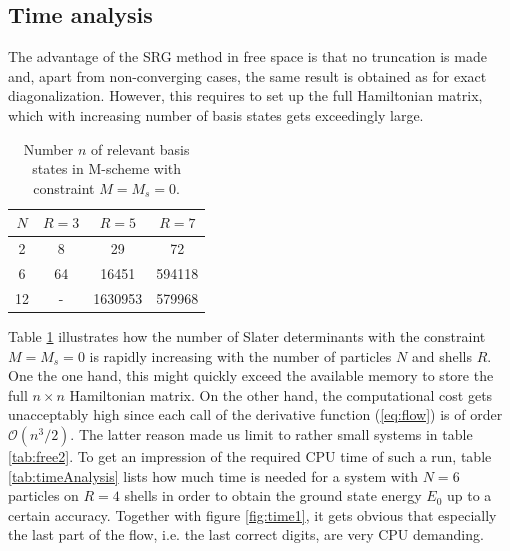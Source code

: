 \subsection{Time analysis}

The advantage of the SRG method in free space is that no truncation is made and, apart from non-converging cases, the same result is obtained as for exact diagonalization. However, this requires to set up the full Hamiltonian matrix, which with increasing number of basis states gets exceedingly large.

\begin{table}
\begin{center}
\begin{tabular}{c| c c c}
\hline
 $N$ & $R=3$ & $R = 5$ & $R = 7$ \\
 \hline
  2  & 8 & 29 & 72\\
  6  & 64 & 16451 & 594118\\
 12  & - & 1630953& 579968 \\ 
 \hline
\end{tabular}
\end{center}
\caption{Number $n$ of relevant basis states in M-scheme with constraint $M = M_s = 0$.}
\label{tab:numBasis}
\end{table}

Table \ref{tab:numBasis} illustrates how the number of Slater determinants with the constraint $M = M_s = 0$ is rapidly increasing with the number of particles $N$ and shells $R$. One the one hand, this might quickly exceed the available memory to store the full $n\times n$ Hamiltonian matrix. On the other hand, the computational cost gets unacceptably high since each call of the derivative function (\ref{eq:flow}) is of order $\mathcal{O}(n^3/2)$. The latter reason made us limit to rather small systems in table \ref{tab:free2}. To get an impression of the required CPU time of such a run, table \ref{tab:timeAnalysis} lists how much time is needed for a system with $N=6$ particles on $R=4$ shells in order to obtain the ground state energy $E_0$ up to a certain accuracy. Together with figure \ref{fig:time1}, it gets obvious that especially the last part of the flow, i.e. the last correct digits, are very CPU demanding. \\


